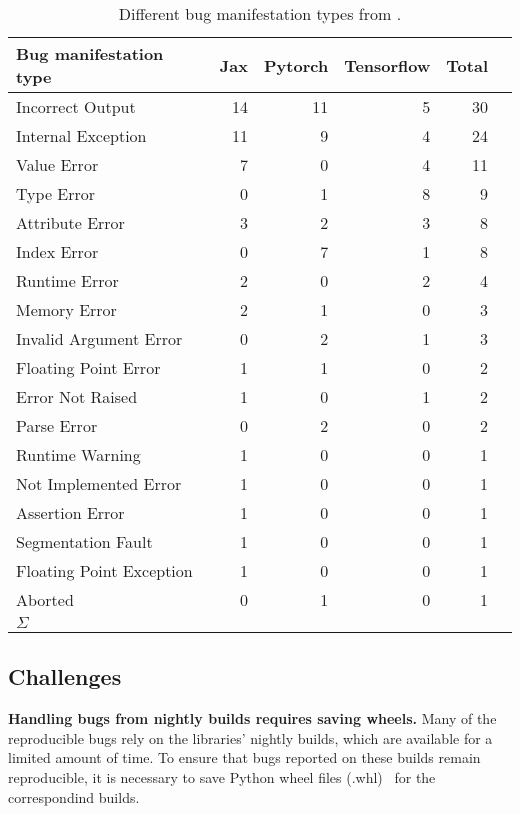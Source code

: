 \documentclass[sigconf,screen]{acmart}
\begin{document}
\begin{table}
  \centering
  \caption{\label{table:bug-stats}Different bug manifestation types
    from \tname.}
  \begin{tabular}{lrrrrr}\toprule
    Bug manifestation type &Jax &Pytorch &Tensorflow &Total \\\midrule
    Incorrect Output &14 &11 &5 &30 \\
    Internal Exception &11 &9 &4 &24 \\
    Value Error &7 &0 &4 &11 \\
    Type Error &0 &1 &8 &9 \\
    Attribute Error &3 &2 &3 &8 \\
    Index Error &0 &7 &1 &8 \\
    Runtime Error &2 &0 &2 &4 \\
    Memory Error &2 &1 &0 &3 \\
    Invalid Argument Error &0 &2 &1 &3 \\
    Floating Point Error &1 &1 &0 &2 \\
    Error Not Raised &1 &0 &1 &2 \\
    Parse Error &0 &2 &0 &2 \\
    Runtime Warning &1 &0 &0 &1 \\
    Not Implemented Error &1 &0 &0 &1 \\
    Assertion Error &1 &0 &0 &1 \\
    Segmentation Fault &1 &0 &0 &1 \\
    Floating Point Exception &1 &0 &0 &1 \\
    Aborted &0 &1 &0 &1 \\
    \midrule
    $\Sigma$ &\numjaxbugs{} &\numtorchbugs{} &\numtfbugs{} &\numbugs{} \\
    \bottomrule
  \end{tabular}
\end{table}

\subsection{Challenges}
\label{sec:challenges}

\textbf{Handling bugs from nightly builds requires saving wheels.}
Many of the reproducible bugs rely on the libraries' nightly builds,
which are available for a limited amount of time. To ensure that bugs
reported on these builds remain reproducible, it is necessary to save
Python wheel files (.whl)~\cite{wheels} for the correspondind builds.
\end{document}
